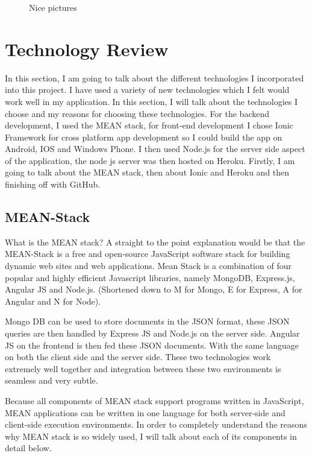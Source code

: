 \begin{figure}
  \centering
  \caption{Nice pictures}
  \label{tikz:graphs}
\end{figure}


\chapter{Technology Review}
In this section, I am going to talk about the different technologies I incorporated into this project.
I have used a variety of new technologies which I felt would work well in my application. In this section, I will talk about the technologies I choose and my reasons for choosing these technologies. 
For the backend development, I used the MEAN stack, for front-end development I chose Ionic Framework for cross platform app development so I could build the app on Android, IOS and Windows Phone. I then used Node.js for the server side aspect of the application, the node js server was then hosted on Heroku. Firstly, I am going to talk about the MEAN stack, then about Ionic and Heroku and then finishing off with GitHub. 

\section{MEAN-Stack}
What is the MEAN stack? A straight to the point explanation would be that the MEAN-Stack is a free and open-source JavaScript software stack for building dynamic web sites and web applications. Mean Stack is a combination of four popular and highly efficient Javascript libraries, namely MongoDB, Express.js, Angular JS and Node.js. (Shortened down to M for Mongo, E for Express, A for Angular and N for Node). 

Mongo DB can be used to store documents in the JSON format, these JSON queries are then handled by Express JS and Node.js on the server side. Angular JS on the frontend is then fed these JSON documents. With the same language on both the client side and the server side. These two technologies work extremely well together and integration between these two environments is seamless and very subtle.\cite{Mean-Stack}

Because all components of MEAN stack support programs written in JavaScript, MEAN applications can be written in one language for both server-side and client-side execution environments. In order to completely understand the reasons why MEAN stack is so widely used, I will talk about each of its components in detail below. 



